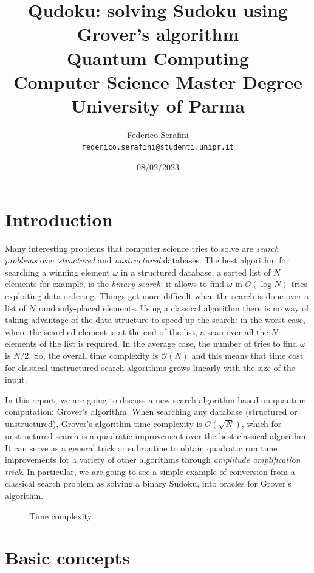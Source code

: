 \documentclass{article}
\title
{
  Qudoku: solving Sudoku using Grover's algorithm \\
  \vspace*{1em}
  \large Quantum Computing\\
         Computer Science Master Degree\\
         University of Parma
}
\author{
  Federico Serafini\\
  \normalsize \texttt{federico.serafini@studenti.unipr.it}
}
\date{08/02/2023}
\begin{document}
\begin{titlepage}
  \clearpage\maketitle
  \thispagestyle{empty}
\end{titlepage}


\tableofcontents
\newpage

\section{Introduction}
Many interesting problems that computer science tries to solve are \emph{search
problems} over \emph{structured} and \emph{unstructured} databases.
The best algorithm for searching a winning element $\omega$ in a structured
database, a sorted list of $N$ elements for example, is the \emph{binary
search}: it allows to find $\omega$ in $\mathcal{O} (\log N)$ tries exploiting
data ordering.
Things get more difficult when the search is done over a list of $N$
randomly-placed elements.
Using a classical algorithm there is no way of taking advantage of
the data structure to speed up the search:
in the worst case, where the searched element is at the end of the list, a scan
over all the $N$ elements of the list is required.
In the average case, the number of tries to find $\omega$ is $N/2$.
So, the overall time complexity is $\mathcal{O}(N)$ and this means that time
cost for classical unstructured search algorithms grows linearly with the size
of the input.

In this report, we are going to discuss a new search
algorithm based on quantum computation: Grover's algorithm.
When searching any database (structured or unstructured), Grover's algorithm
time complexity is $\mathcal{O}(\sqrt N)$, which for unstructured
search is a quadratic improvement over the best classical algorithm.
It can serve as a general trick or subroutine to
obtain quadratic run time improvements for a variety of other algorithms
through \emph{amplitude amplification trick}.
In particular, we are going to see a simple example of conversion from a
classical search problem as solving a binary Sudoku, into oracles for Grover's
algorithm.
\begin{figure}[H]
  \centering
  
  \caption{Time complexity.}
\end{figure}

\section{Basic concepts}
\end{document}
